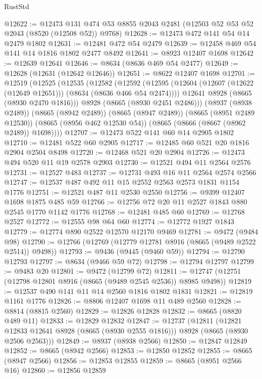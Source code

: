 \begin{lexlean}{RustStd}
\begin{coremodule}
@12622 := @12473
    @131
    @474
    @53
    @8855
    @2043
    @2481
    (@12503 @52 @53 @52 @2043 (@8520 (@12508 @52)) @9768)
@12628 := @12473 @472 @141 @54 @14 @2479 @1802
@12631 := @12481 @472 @54 @2479
@12639 := @12458 @469 @54 @141 @14 @1816 @1802 @2477 @8492
@12641 := @8923 @12407 @1698
@12642 := @12639 @12641
@12646 := @8634 (@8636 @469 @54 @2477)
@12649 := @12628 (@12631 (@12642 @12646))
@12651 := @8622 @12407 @1698
@12701 := @12519
    (@12525
      (@12535
        (@12582
          (@12592
            (@12595 (@12604 (@12607 (@12622 (@12649 @12651))) (@8634 (@8636 @466 @54 @2474))))
            @12641
            @8928
            (@8665 (@8930 @2470 @1816)))
          @8928
          (@8665 (@8930 @2451 @2486)))
        (@8937 (@8938 @2489))
        (@8665 (@8942 @2489))
        (@8665 (@8947 @2489))
        (@8665 (@8951 @2489 @12530))
        (@8665 (@8956 @462 @12530 @54))
        (@8665 (@8666 (@8667 (@8962 @2489)) @1698))))
@12707 := @12473 @522 @141 @60 @14 @2905 @1802
@12710 := @12481 @522 @60 @2905
@12717 := @12485 @60 @521 @20 @1816 @2904 @2504 @8498
@12720 := @12468 @521 @20 @2904
@12726 := @12473 @494 @520 @11 @19 @2578 @2903
@12730 := @12521 @494 @11 @2564 @2576
@12731 := @12527 @483
@12737 := @12731 @493 @16 @11 @2564 @2574 @2566
@12747 := @12537 @487 @492 @11 @15 @2552 @2563 @2573 @1831 @1154 @1776
@12751 := @12521 @487 @11 @2530 @2550
@12756 := @9399 @12407 @1698 @1875 @485 @59
@12766 := @12756 @72 @20 @11 @2527 @1843 @880 @2545 @1770 @1142 @1776
@12768 := @12481 @485 @60
@12769 := @12768 @2527
@12772 := @12555 @98 @64 @60
@12774 := @12772 @1927 @1843
@12779 := @12774 @890 @2522 @12570 @12170 @9469
@12781 := @9472 (@9484 @98)
@12790 := @12766 (@12769 (@12779 @12781 @8916 (@8665 (@9489 @2522 @2514)) @9498))
@12793 := @9436 (@9445 (@9460 @59))
@12794 := @12790 @12793
@12797 := @8634 (@9466 @59 @72)
@12798 := @12794 @12797
@12799 := @9483 @20
@12801 := @9472 (@12799 @72)
@12811 := @12747 (@12751 (@12798 @12801 @8916 (@8665 (@9489 @2545 @2536)) @8985 @9498))
@12819 := @12537 @490 @141 @11 @14 @2560 @1816 @1802 @1831
@12821 := @12819 @1161 @1776
@12826 := @8806 @12407 @1698 @11 @489 @2560
@12828 := @8814 (@8815 @2560)
@12829 := @12826 @12828
@12832 := @8665 (@8820 @489 @11)
@12833 := @12829 @12832
@12847 := @12737
    (@12811
      (@12821 @12833 @12641 @8928 (@8665 (@8930 @2555 @1816)))
      @8928
      (@8665 (@8930 @2506 @2563)))
@12849 := @8937 (@8938 @2566)
@12850 := @12847 @12849
@12852 := @8665 (@8942 @2566)
@12853 := @12850 @12852
@12855 := @8665 (@8947 @2566)
@12856 := @12853 @12855
@12859 := @8665 (@8951 @2566 @16)
@12860 := @12856 @12859

\end{coremodule}
\end{lexlean}
